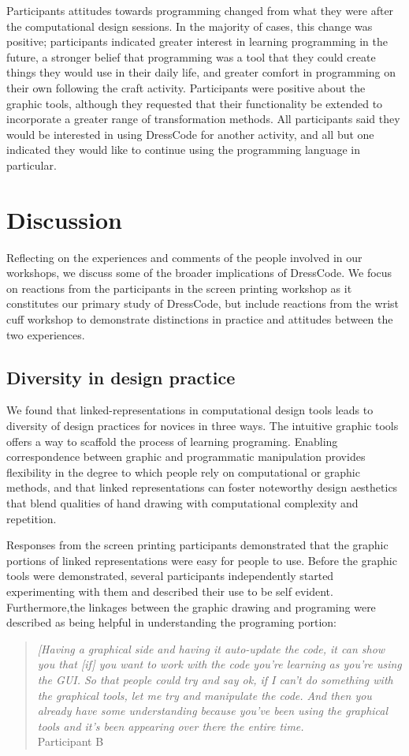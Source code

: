 \documentclass{sigchi}
\begin{document}
Participants attitudes towards programming changed from what they were after the computational design sessions. In the majority of cases, this change was positive; participants indicated greater interest in learning programming in the future, a stronger belief that programming was a tool that they could create things they would use in their daily life, and greater comfort in programming on their own following the craft activity. Participants were positive about the graphic tools, although they requested that their functionality be extended to incorporate a greater range of transformation methods. All participants said they would be interested in using DressCode for another activity, and all but one indicated they would like to continue using the programming language in particular.

\section{Discussion}
Reflecting on the experiences and comments of the people involved in our workshops, we discuss some of the broader implications of DressCode. We focus on reactions from the participants in the screen printing workshop as it constitutes our primary study of DressCode, but include reactions from the wrist cuff workshop to demonstrate distinctions in practice and attitudes between the two experiences. 

\subsection{Diversity in design practice}
We found that linked-representations in computational design tools leads to diversity of design practices for novices in three ways. The intuitive graphic tools offers a way to scaffold the process of learning programing. Enabling correspondence between graphic and programmatic manipulation provides flexibility in the degree to which people rely on computational or graphic methods, and that linked representations can foster noteworthy design aesthetics that blend qualities of hand drawing with computational complexity and repetition.

Responses from the screen printing participants demonstrated that the graphic portions of linked representations were easy for people to use. Before the graphic tools were demonstrated, several participants independently started experimenting with them and described their use to be self evident. Furthermore,the linkages between the graphic drawing and programing were described as being helpful in understanding the programing portion:
\begin{quote}
\textit{[Having a graphical side and having it auto-update the code, it can show you that [if] you want to work with the code you're learning as you're using the GUI. So that people could try and say ok, if I can't do something with the graphical tools, let me try and manipulate the code. And then you already have some understanding because you've been using the graphical tools and it's been appearing over there the entire time.}
\\Participant B
\end{quote} 
\end{document}
